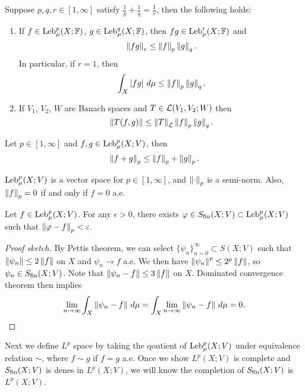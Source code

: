 \documentclass[a4paper]{article}
\renewcommand{\seqinfn}[1]{\{ #1 \}_{n=0}^\infty}
\begin{document}
\begin{thm}
Suppose $p, q, r \in [1, \infty]$ satisfy $\frac{1}{p} + \frac{1}{q}
= \frac{1}{r}$, then the following holds:
\begin{enumerate}
\item If $f \in \operatorname{Leb}_\mu^p(X; \mathbb{F})$, $g \in \operatorname{Leb}_\mu^q (X; \mathbb{F})$,
then $f g \in \operatorname{Leb}_\mu^r (X; \mathbb{F})$ and
\[
\left\lVert f g\right\rVert_r \leq \left\lVert f\right\rVert_p \left\lVert g\right\rVert_q.
\]
In particular, if $r = 1$, then
\[
\int_X \left\lvert f g\right\rvert \, d \mu \leq \left\lVert f\right\rVert_p \left\lVert g\right\rVert_q.
\]

\item If $V_1$, $V_2$, $W$ are Banach spaces and
$T \in \mathcal{L}(V_1, V_2 ; W)$ then
\[
\left\lVert T (f, g)\right\rVert \leq \left\lVert T\right\rVert_{\mathcal{L}} \left\lVert f\right\rVert_p \left\lVert g\right\rVert_q.
\]
\end{enumerate}
\end{thm}


\begin{thm}
Let $p \in [1, \infty]$ and $f, g \in \operatorname{Leb}_\mu^p(X ; V)$, then
\[
\left\lVert f + g\right\rVert_p \leq \left\lVert f\right\rVert_p + \left\lVert g\right\rVert_p.
\]
\end{thm}

\begin{cor}
$\operatorname{Leb}_\mu^p(X; V)$ is a vector space for $p \in [1, \infty]$,
and $\left\lVert \cdot\right\rVert_p$ is a semi-norm. Also,
$\left\lVert f\right\rVert_p = 0$ if and only if $f = 0$ a.e.
\end{cor}

\begin{thm}
Let $f \in \operatorname{Leb}_\mu^p (X; V)$. For any $\epsilon > 0$,
there exists $\varphi \in S_{\text{fin}}(X; V) \subset \operatorname{Leb}_\mu^p (X; V)$
such that $\left\lVert \varphi - f\right\rVert_p < \varepsilon$.
\end{thm}

\begin{proof}[Proof sketch]
By Pettis theorem, we can select $\seqinfn{\psi_n} \subset
S(X; V)$ such that $\left\lVert \psi_n\right\rVert \leq 2 \left\lVert f\right\rVert$
on $X$ and $\psi_n \to f$ a.e. We then have
$\left\lVert \psi_n\right\rVert^p \leq 2^p \left\lVert f\right\rVert$, so $\psi_n
\in S_{\text{fin}}(X ; V)$. Note that $\left\lVert \psi_n - f\right\rVert \leq
3 \left\lVert f\right\rVert$ on $X$. Dominated convergence theorem then implies
\[
\lim_{n \to \infty} \int_X \left\lVert \psi_n - f\right\rVert \, d \mu
= \int_X \lim_{n \to \infty} \left\lVert \psi_n - f\right\rVert \, d \mu
= 0.
\]
\end{proof}

Next we define $L^p$ space by taking the qoutient of
$\operatorname{Leb}_\mu^p (X; V)$ under equivalence relation $\sim$,
where $f \sim g$ if $f = g$ a.e. Once we show
$L^p(X; V)$ is complete and $S_{\text{fin}}(X; V)$ is denes in
$L^p(X; V)$, we will know the completion of
$S_{\text{fin}}(X; V)$ is $L^p(X; V)$.
\end{document}
